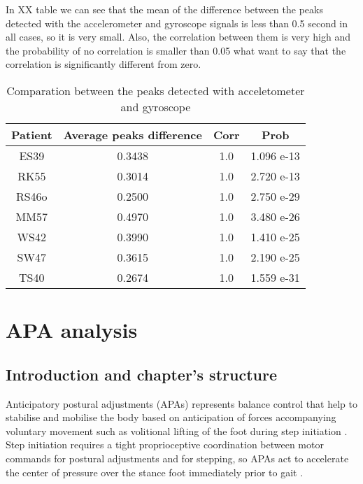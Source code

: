 In XX table we can see that the mean of the difference between the peaks detected with the accelerometer and gyroscope signals is less than 0.5 second in all cases, so it is very small. Also, the correlation between them is very high and the probability of no correlation is smaller than 0.05 what want to say that the correlation is significantly different from zero.

\begin{table}[h]
	\caption{Comparation between the peaks detected with acceletometer and gyroscope}	
	\centering
	\begin{tabular}{|c|c|c|c|}\hline
		
		Patient 				& Average peaks difference 	& Corr 	& Prob 	\\ \hline
		ES39 & 0.3438			& 1.0									& 1.096 e-13					\\
		RK55	& 0.3014			& 1.0									& 2.720 e-13				\\
		RS46o & 0.2500			& 1.0									& 2.750  e-29					\\
		MM57	& 0.4970			& 1.0									& 3.480 e-26					\\
		WS42  & 0.3990			& 1.0									& 1.410 e-25					\\
		SW47	& 0.3615			& 1.0									& 2.190 e-25					\\
		TS40  & 0.2674			& 1.0									& 1.559 e-31				\\ \hline
	\end{tabular}
	\label{tab:comparationAccGyro}
	
\end{table}



\section{APA analysis}
\subsection{Introduction and chapter's structure}

Anticipatory postural adjustments (APAs)  represents balance control that help to stabilise and mobilise the body based on anticipation of forces accompanying voluntary movement such as volitional lifting of the foot during step initiation \cite{Mancini2010} . Step initiation requires a tight proprioceptive coordination between motor commands for postural adjustments and for stepping, so APAs act to accelerate the center of pressure over the stance foot immediately prior to gait \cite{Mancini2009} .

